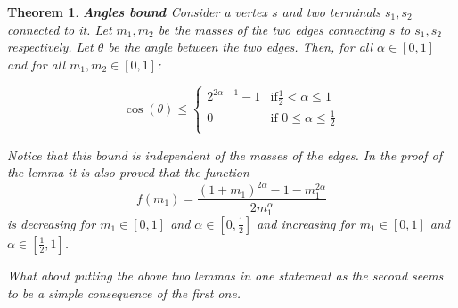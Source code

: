 \documentclass[11pt,reqno,a4paper]{amsart}
\numberwithin{equation}{section}
\theoremstyle{mytheorem}
\newtheorem{theorem}[subsection]{Theorem}
\theoremstyle{myremark}
\theoremstyle{myparagraph}
\begin{document}
    \begin{theorem}
        \label{lemma:bernot_angles_sum_bound}
        \textbf{Angles bound \cite[Lemma 12.5]{Bernot}}
        Consider a vertex $s$ and two terminals $s_1, s_2$ connected to it. Let $m_1, m_2$ be the masses of the two edges connecting
        $s$ to $s_1, s_2$ respectively. Let $\theta$ be the angle between the two edges.
        Then, for all $\alpha \in [0,1]$ and for all $m_1, m_2 \in [0,1]$:

        \begin{equation}
            \cos(\theta) \le \begin{cases}
                                 2^{2\alpha-1}-1 & \text{if} \frac{1}{2} < \alpha \le 1\\
                                 0 & \text{if 0} \le \alpha \le \frac{1}{2}\\
            \end{cases}
        \end{equation}

        Notice that this bound is independent of the masses of the edges. In the proof of the lemma it is also proved that the function
        \begin{equation}
            f(m_1) = \frac{(1+m_1)^{2\alpha} - 1 - m_1^{2\alpha}}{2m_1^\alpha}
        \end{equation}
        is decreasing for $m_1 \in [0,1]$ and $\alpha \in [0,\frac{1}{2}]$ and increasing for $m_1 \in [0,1]$ and $\alpha \in [\frac{1}{2},1]$.

        What about putting the above two lemmas in one statement as the second seems to be a simple consequence of the first one.

    \end{theorem}
\end{document}
